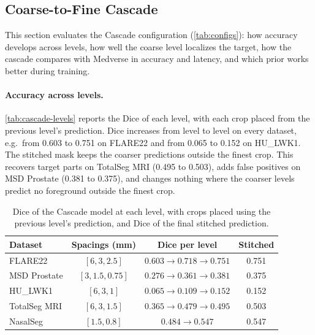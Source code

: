 \subsection{Coarse-to-Fine Cascade}\label{sec:results-cascade}

This section evaluates the Cascade configuration (\autoref{tab:configs}): how
accuracy develops across levels, how well the coarse level localizes the
target, how the cascade compares with Medverse in accuracy and latency, and
which prior works better during training.

\paragraph{Accuracy across levels.}
\autoref{tab:cascade-levels} reports the Dice of each level, with each crop
placed from the previous level's prediction. Dice increases from level to
level on every dataset, e.g.\ from 0.603 to 0.751 on FLARE22 and from 0.065
to 0.152 on HU\_LWK1. The stitched mask keeps the coarser predictions outside
the finest crop. This recovers target parts on TotalSeg MRI (0.495 to 0.503),
adds false positives on MSD Prostate (0.381 to 0.375), and changes nothing
where the coarser levels predict no foreground outside the finest crop.

\begin{table}[t]
  \centering
  \small
  \caption{Dice of the Cascade model at each level, with crops placed using the
  previous level's prediction, and Dice of the final stitched prediction.}
  \label{tab:cascade-levels}
  \begin{tabular}{@{}lccc@{}}
    \toprule
    Dataset & Spacings (mm) & Dice per level & Stitched \\
    \midrule
    FLARE22      & $[6, 3, 2.5]$    & $0.603 \to 0.718 \to 0.751$ & 0.751 \\
    MSD Prostate & $[3, 1.5, 0.75]$ & $0.276 \to 0.361 \to 0.381$ & 0.375 \\
    HU\_LWK1     & $[6, 3, 1]$      & $0.065 \to 0.109 \to 0.152$ & 0.152 \\
    TotalSeg MRI & $[6, 3, 1.5]$    & $0.365 \to 0.479 \to 0.495$ & 0.503 \\
    NasalSeg     & $[1.5, 0.8]$     & $0.484 \to 0.547$           & 0.547 \\
    \bottomrule
  \end{tabular}
\end{table}

